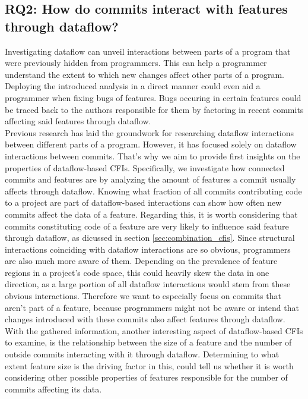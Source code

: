 \subsection*{\textbf{RQ2: How do commits interact with features through dataflow?}}

Investigating dataflow can unveil interactions between parts of a program that were previously hidden from programmers.
This can help a programmer understand the extent to which new changes affect other parts of a program.
Deploying the introduced analysis in a direct manner could even aid a programmer when fixing bugs of features.
Bugs occuring in certain features could be traced back to the authors responsible for them by factoring in recent commits affecting said features through dataflow. \\
Previous research has laid the groundwork for researching dataflow interactions between different parts of a program.
However, it has focused solely on dataflow interactions between commits.
That's why we aim to provide first insights on the properties of dataflow-based CFIs.
Specifically, we investigate how connected commits and features are by analyzing the amount of features a commit usually affects through dataflow.
Knowing what fraction of all commits contributing code to a project are part of dataflow-based interactions can show how often new commits affect the data of a feature. 
Regarding this, it is worth considering that commits constituting code of a feature are very likely to influence said feature through dataflow, as dicussed in section \ref{sec:combination_cfis}.
Since structural interactions coinciding with dataflow interactions are so obvious, programmers are also much more aware of them. 
Depending on the prevalence of feature regions in a project's code space, this could heavily skew the data in one direction, as a large portion of all dataflow interactions would stem from these obvious interactions. 
Therefore we want to especially focus on commits that aren't part of a feature, because programmers might not be aware or intend that changes introduced with these commits also affect features through dataflow. 
With the gathered information, another interesting aspect of dataflow-based CFIs to examine, is the relationship between the size of a feature and the number of outside commits interacting with it through dataflow.
Determining to what extent feature size is the driving factor in this, could tell us whether it is worth considering other possible properties of features responsible for the number of commits affecting its data.

